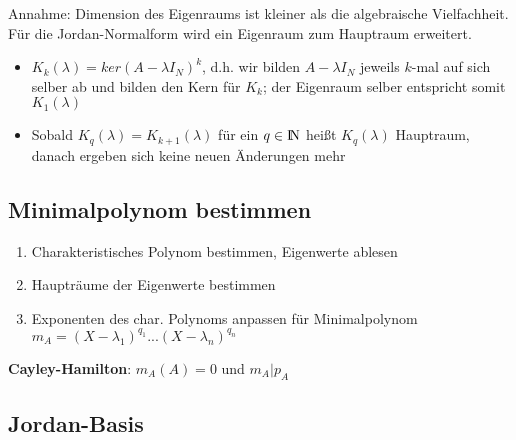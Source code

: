 \documentclass[10pt,a4paper]{article}
\def\naturalnumbers{{\rm I\!N}}
\begin{document}
	Annahme: Dimension des Eigenraums ist kleiner als die algebraische Vielfachheit. Für die Jordan-Normalform wird ein Eigenraum zum Hauptraum erweitert.
	\begin{itemize}
		\item $K_k(\lambda) = ker(A - \lambda I_N)^k$, d.h. wir bilden $A - \lambda I_N$ jeweils $k$-mal auf sich selber ab und bilden den Kern für $K_k$; der Eigenraum selber entspricht somit $K_1(\lambda)$
		\item Sobald $K_q(\lambda) = K_{k + 1}(\lambda)$ für ein $q \in \naturalnumbers$ heißt $K_q(\lambda)$ Hauptraum, danach ergeben sich keine neuen Änderungen mehr
	\end{itemize}
	
	\subsection{Minimalpolynom bestimmen}
	\label{jd:sub:minimalpolynom_bestimmen}
	
	\begin{enumerate}
		\item Charakteristisches Polynom bestimmen, Eigenwerte ablesen
		\item Haupträume der Eigenwerte bestimmen
		\item Exponenten des char. Polynoms anpassen für Minimalpolynom $m_A = (X - \lambda_1)^{q_1} ... (X - \lambda_n)^{q_n}$
	\end{enumerate}
	\textbf{Cayley-Hamilton}: $m_A(A) = 0$ und $m_A|p_A$

	\newpage
	\subsection{Jordan-Basis}
	\label{jd:sub:jordan_basis}
	
\end{document}
